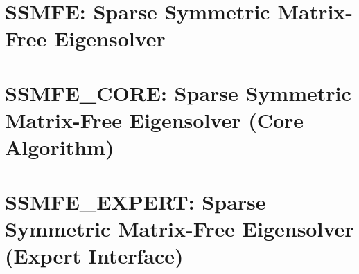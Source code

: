 \documentclass{spralweb}
\begin{document}
\chapter{SSMFE: Sparse Symmetric Matrix-Free Eigensolver}

\chapter{SSMFE\_CORE: Sparse Symmetric Matrix-Free Eigensolver (Core Algorithm)}

\chapter{SSMFE\_EXPERT: Sparse Symmetric Matrix-Free Eigensolver (Expert Interface)}

\end{document}
